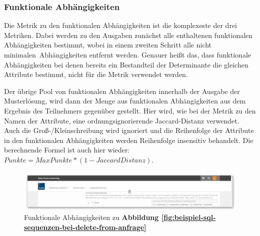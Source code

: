         \subsubsection{Funktionale Abhängigkeiten}
        
            Die Metrik zu den funktionalen Abhängigkeiten ist die komplexeste der drei Metriken. Dabei werden zu den Ausgaben zunächst alle enthaltenen funktionalen Abhängigkeiten bestimmt, wobei in einem zweiten Schritt alle \glqq nicht minimalen\grqq\ Abhängigkeiten entfernt werden. Genauer heißt das, dass funktionale Abhängigkeiten bei denen bereits ein Bestandteil der Determinante die gleichen Attribute bestimmt, nicht für die Metrik verwendet werden. 
            
            Der übrige Pool von funktionalen Abhängigkeiten innerhalb der Ausgabe der Musterlösung, wird dann der Menge aus funktionalen Abhängigkeiten aus dem Ergebnis des Teilnehmers gegenüber gestellt. Hier wird, wie bei der Metrik zu den Namen der Attribute, eine ordnungsignorierende Jaccard-Distanz verwendet. Auch die Groß-/Kleinschreibung wird ignoriert und die Reihenfolge der Attribute in den funktionalen Abhängigkeiten werden Reihenfolge insensitiv behandelt. Die berechnende Formel ist auch hier wieder: $ Punkte = MaxPunkte * (1 - JaccardDistanz) $.
            
            \begin{figure}[H]
                \begin{center}
                    \includegraphics[page=1, width=0.7\paperwidth, trim=4 4 4 4, clip]{fig/Beispiel-Funktionale-Abhaengigkeiten-DELETE-FROM.png} 
                    \caption{Funktionale Abhängigkeiten zu \textbf{Abbildung \ref{fig:beispiel-sql-sequenzen-bei-delete-from-anfrage}}}
                    \label{fig:beispiel-funktionale-abhaengigkeiten-delete-from-anfrage}
                \end{center}
            \end{figure}